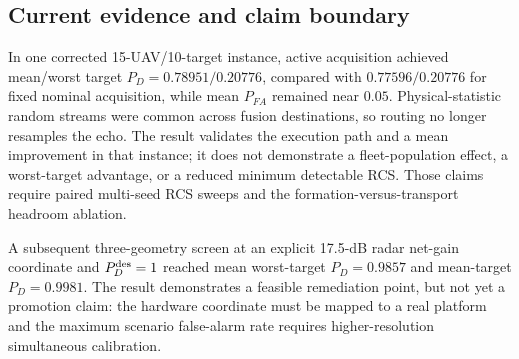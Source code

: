 \subsection{Current evidence and claim boundary}

In one corrected 15-UAV/10-target instance, active acquisition achieved
mean/worst target $P_D=0.78951/0.20776$, compared with
$0.77596/0.20776$ for fixed nominal acquisition, while mean $P_{FA}$ remained
near $0.05$. Physical-statistic random streams were common across fusion
destinations, so routing no longer resamples the echo. The result validates the
execution path and a mean improvement in that instance; it does not demonstrate
a fleet-population effect, a worst-target advantage, or a reduced minimum
detectable RCS. Those claims require paired multi-seed RCS sweeps and the
formation-versus-transport headroom ablation.

A subsequent three-geometry screen at an explicit 17.5-dB radar net-gain
coordinate and $P_D^{\rm des}=1$ reached mean worst-target
$P_D=0.9857$ and mean-target $P_D=0.9981$. The result demonstrates a feasible
remediation point, but not yet a promotion claim: the hardware coordinate must
be mapped to a real platform and the maximum scenario false-alarm rate requires
higher-resolution simultaneous calibration.
